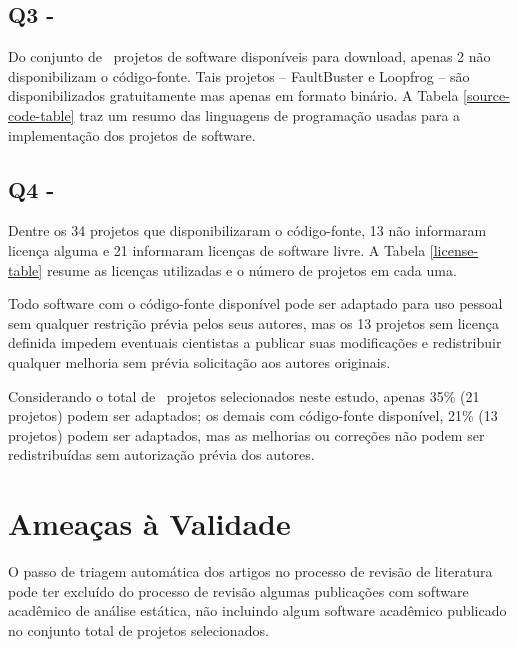 \subsection{Q3 - \EstudoUmQuestaoTres} %

Do conjunto de \SoftwareDownloadAvailableCount \ projetos de software disponíveis para download, apenas 2 não
disponibilizam o código-fonte. Tais projetos -- FaultBuster e Loopfrog --
são disponibilizados gratuitamente mas apenas em
formato binário. A Tabela \ref{source-code-table} traz um resumo das
linguagens de programação usadas para a implementação dos projetos de software.



\subsection{Q4 - \EstudoUmQuestaoQuatro} %

Dentre os 34 projetos que disponibilizaram o código-fonte, 13 não informaram
licença alguma e 21 informaram licenças de software livre.
A Tabela \ref{license-table} resume as licenças utilizadas e o
número de projetos em cada uma.



Todo software com o código-fonte disponível pode ser adaptado para uso pessoal
sem qualquer restrição prévia pelos seus autores, mas os 13 projetos sem
licença definida impedem eventuais cientistas a publicar suas modificações e
redistribuir qualquer melhoria sem prévia solicitação aos autores originais.

Considerando o total de \SoftwareCount \ projetos selecionados neste estudo, apenas 35\% (21
projetos) podem ser adaptados; os demais com código-fonte disponível, 21\% (13 projetos) podem ser
adaptados, mas as melhorias ou correções não podem ser redistribuídas sem
autorização prévia dos autores.


\section{Ameaças à Validade} %

O passo de triagem automática dos artigos no processo de revisão de literatura
pode ter excluído do processo de revisão algumas publicações com software
acadêmico de análise estática, 
não incluindo algum software acadêmico publicado no conjunto total de projetos
selecionados.

